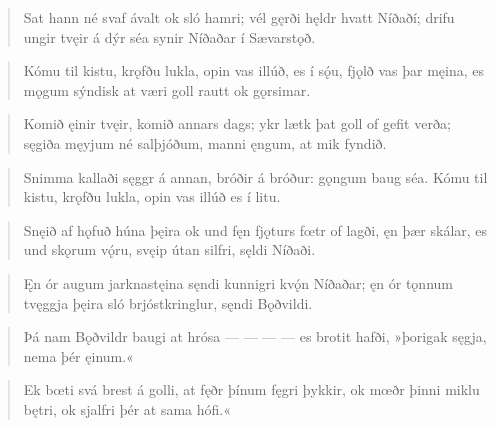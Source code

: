 
\begin{verse}
\bva Sat hann né svaf ávalt
ok sló hamri;
vél gęrði hęldr
hvatt Níðaðí;
drifu ungir tvęir
á dýr séa
synir Níðaðar
í Sævarstǫð.\\%
\end{verse}


\begin{verse}
\bva Kómu til kistu,
krǫfðu lukla,
opin vas illúð,
es í sǫ́u,
fjǫlð vas þar męina,
es mǫgum sýndisk
at væri goll rautt
ok gǫrsimar.\\%
\end{verse}


\begin{verse}
\bva Komið ęinir tvęir,
komið annars dags;
ykr lætk þat goll
of gefit verða;
sęgiða męyjum
né salþjóðum,
manni ęngum,
at mik fyndið.\\%
\end{verse}


\begin{verse}
\bva Snimma kallaði
sęggr á annan,
bróðir á bróður:
gǫngum baug séa.
Kómu til kistu,
krǫfðu lukla,
opin vas illúð
es í litu.\\%
\end{verse}


\begin{verse}
\bva Snęið af hǫfuð
húna þęira
ok und fęn fjǫturs
fœtr of lagði,
ęn þær skálar,
es und skǫrum vǫ́ru,
svęip útan silfri,
sęldi Níðaði.\\%
\end{verse}


\begin{verse}
\bva Ęn ór augum
jarknastęina
sęndi kunnigri
kvǫ́n Níðaðar;
ęn ór tǫnnum
tvęggja þęira
sló brjóstkringlur,
sęndi Bǫðvildi.\\%
\end{verse}


\begin{verse}
\bva Þá nam Bǫðvildr
baugi at hrósa
— — — —
es brotit hafði,
»þorigak sęgja,
nema þér ęinum.« \\%
\end{verse}


\begin{verse}
\bva Ek bœti svá
brest á golli,
at fęðr þínum
fęgri þykkir,
ok mœðr þinni
miklu bętri,
ok sjalfri þér
at sama hófi.« \\%
\end{verse}

